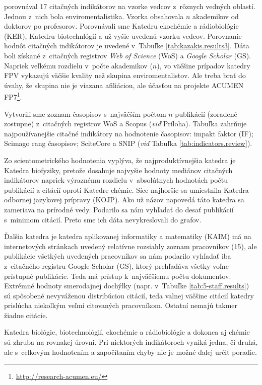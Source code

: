 \citet{Wildgaard2015} porovnával 17 citačných indikátorov na vzorke vedcov
z~rôznych vedných oblastí. Jednou z~nich bola enviromentalistika. Vzorka
obsahovala $n$ akademikov od doktorov po profesorov. Porovnávali sme Katedru
ekochémie a rádiobiológie (KER), Katedru biotechnlógií a už vyšie uvedenú vzorku
vedcov.  Porovnanie hodnôt citačných indikátorov je uvedené v~Tabuľke
\ref{tab:kazakis.results3}.  Dáta boli získané z~citačných registrov \emph{Web
  of Science} (WoS) a \emph{Google Scholar} (GS).  Napriek veľkému rozdielu
v~počte akademikov ($n$), vo väčšine prípadov katedry FPV vykazujú väčšie
kvality než skupina enviromentalistov. Ale treba brať do úvahy, že skupina nie
je viazana afiliáciou, ale účasťou na projekte ACUMEN
FP7\footnote{\url{http://research-acumen.eu/}}.

Vytvorili sme zoznam časopisov s~najväčším počtom $n$ publikácií (zoradené
zostupne) z~citačných registrov WoS a Scopus (\emph{viď} Príloha).  Tabuľka
zahrňuje najpoužívanejšie citačné indikátory na hodnotenie časopisov: impakt
faktor (IF); Scimago rang časopisov; SciteCore a SNIP (\emph{viď} Tabuľka
\ref{tab:indicators.review}).

Zo scientometrického hodnotenia vyplýva, že najproduktívnejšia katedra je
Katedra biofyziky, pretože dosahuje najvyšie hodnoty mediánov citačných
indikátorov napriek výraznému rozdielu v~absolútnych hodnotách počtu publikácií
a citácií oproti Katedre chémie. Síce najhoršie sa umiestnila Katedra odbornej
jazykovej prípravy (KOJP). Ako už názov napovedá táto katedra sa zameriava na
prírodné vedy. Podarilo sa nám vyhľadať do desať publikácií s~minimom citácií.
Preto sme ich dáta nevykresľovali do grafov.

Ďalšia katedra je katedra aplikovanej informatiky a matematiky (KAIM) má na
internetových stránkach uvedený relatívne rozsiahly zoznam pracovníkov (15), ale
publikácie všetkých uvedených pracovníkov sa nám podarilo vyhľadať iba
z~citačného registru Google Scholar (GS), ktorý prehľadáva všetky voľne
prístupné publikácie. Teda má prístup k~najväčšiemu počtu dokumentov. Extrémné
hodnoty smerodajnej dochýlky (napr. v~Tabuľke \ref{tab:5-staff.results}) sú
spôsobené nevyváženou distribúciou citácií, teda valnej väčšine citácií katedry
prislúcha niekoľkým veľmi citovaných pracovníkom. Ostatní nemajú takmer žiadne
citácie.

Katedra biológie, biotechnológií, ekochémie a rádiobiológie a dokonca aj chémie
sú zhruba na rovnakej úrovni. Pri niektorých indikátoroch vyniká jedna, či
druhá, ale s~celkovým hodnotením a započítaním chyby nie je možné ďalej určiť
poradie.

